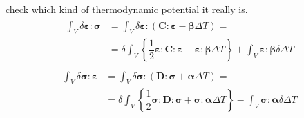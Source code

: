 \documentclass[letterpaper,10pt,english]{jupyterBook}
\begin{document}
\sphinxAtStartPar
{} check which kind of thermodynamic potential it really is.
\begin{equation*}
\begin{split}\begin{aligned}
  \int_V \delta \boldsymbol\varepsilon : \boldsymbol\sigma 
  & = \int_V \delta \boldsymbol\varepsilon : \left( \mathbf{C} : \boldsymbol\varepsilon - \boldsymbol\beta \Delta T \right) = \\
  & = \delta \int_V \left\{ \dfrac{1}{2} \boldsymbol\varepsilon : \mathbf{C} : \boldsymbol\varepsilon - \boldsymbol\varepsilon : \boldsymbol\beta \Delta T \right\} + \int_V \boldsymbol\varepsilon : \boldsymbol\beta \delta \Delta T 
\end{aligned}\end{split}
\end{equation*}\begin{equation*}
\begin{split}\begin{aligned}
  \int_V \delta \boldsymbol\sigma : \boldsymbol\varepsilon
  & = \int_V \delta \boldsymbol\sigma : \left( \mathbf{D} : \boldsymbol\sigma + \boldsymbol\alpha \Delta T \right) = \\
  & = \delta \int_V \left\{ \dfrac{1}{2} \boldsymbol\sigma : \mathbf{D} : \boldsymbol\sigma + \boldsymbol\sigma : \boldsymbol\alpha\Delta T \right\} - \int_V \boldsymbol\sigma : \boldsymbol\alpha\delta \Delta T 
\end{aligned}\end{split}
\end{equation*}
\end{document}
